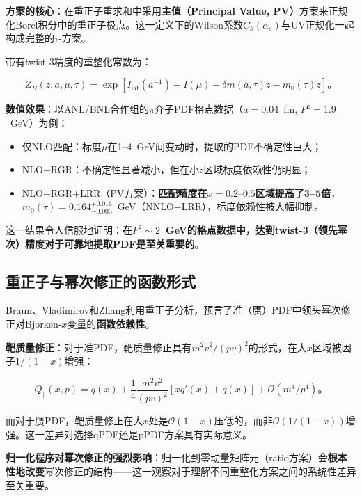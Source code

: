 \documentclass[12pt,a4paper]{ctexart}
\theoremstyle{definition}
\begin{document}
\textbf{方案的核心}\cite{Zhang2023RGR}：在重正子重求和中采用\textbf{主值（Principal Value, PV）}方案来正规化Borel积分中的重正子极点。这一定义下的Wilson系数$C_k(\alpha_s)$与UV正规化一起构成完整的$\tau$-方案。

带有twist-3精度的重整化常数为\cite{Zhang2023RGR}：

\begin{equation}
\boxed{Z_R(z, a, \mu, \tau) = \exp[I_{\text{lat}}(a^{-1}) - I(\mu) - \delta m(a,\tau)z - m_0(\tau)z]}。
\label{eq:ZR_twist3}
\end{equation}

\textbf{数值效果}\cite{Zhang2023RGR}：以ANL/BNL合作组的$\pi$介子PDF格点数据（$a = 0.04$~fm, $P^z = 1.9$~GeV）为例：
\begin{itemize}
    \item 仅NLO匹配：标度$\mu$在1--4~GeV间变动时，提取的PDF不确定性巨大；
    \item NLO+RGR：不确定性显著减小，但在小$z$区域标度依赖性仍明显；
    \item NLO+RGR+LRR（PV方案）：\textbf{匹配精度在$x = 0.2\text{--}0.5$区域提高了3--5倍}，$m_0(\tau) = 0.164^{+0.016}_{-0.003}$~GeV（NNLO+LRR），标度依赖性被大幅抑制。
\end{itemize}

这一结果令人信服地证明：\textbf{在$P^z \sim 2$~GeV的格点数据中，达到twist-3（领先幂次）精度对于可靠地提取PDF是至关重要的}。

\subsection{重正子与幂次修正的函数形式}

Braun、Vladimirov和Zhang\cite{Braun2019power}利用重正子分析，预言了准（赝）PDF中领头幂次修正对Bjorken-$x$变量的\textbf{函数依赖性}。

\textbf{靶质量修正}：对于准PDF，靶质量修正具有$m^2 v^2/(pv)^2$的形式，在大$x$区域被因子$1/(1-x)$增强\cite{Braun2019power}：

\begin{equation}
Q_\parallel(x, p) = q(x) + \frac{1}{4}\frac{m^2 v^2}{(pv)^2} [x q'(x) + q(x)] + \mathcal{O}(m^4/p^4)。
\label{eq:target_mass_qPDF}
\end{equation}

而对于赝PDF，靶质量修正在大$x$处是$\mathcal{O}(1-x)$压低的，而非$\mathcal{O}(1/(1-x))$增强。这一差异对选择qPDF还是pPDF方案具有实际意义。

\textbf{归一化程序对幂次修正的强烈影响}\cite{Braun2019power}：归一化到零动量矩阵元（ratio方案）会\textbf{根本性地改变}幂次修正的结构——这一观察对于理解不同重整化方案之间的系统性差异至关重要。
\end{document}
